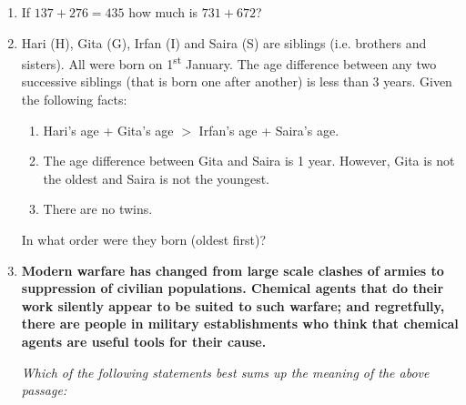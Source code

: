 \documentclass[journal,12pt,onecolumn]{IEEEtran}
\theoremstyle{remark}
\begin{document}
\begin{enumerate}
\begin{enumerate}  \end{enumerate}

\item If $137 + 276 = 435$ how much is $731 + 672$?\hfill{}

\begin{enumerate}  \end{enumerate}

\item Hari (H), Gita (G), Irfan (I) and Saira (S) are siblings (i.e. brothers and sisters). All were born on 1\textsuperscript{st} January. The age difference between any two successive siblings (that is born one after another) is less than 3 years. Given the following facts:

\begin{enumerate}
		\item Hari's age + Gita's age $>$ Irfan's age + Saira's age.
		\item The age difference between Gita and Saira is 1 year. However, Gita is not the oldest and Saira is not the youngest.
		\item There are no twins.
	\end{enumerate}
	In what order were they born (oldest first)?\hfill{}


\begin{enumerate}  \end{enumerate}

\item \textbf{Modern warfare has changed from large scale clashes of armies to suppression of civilian populations. Chemical agents that do their work silently appear to be suited to such warfare; and regretfully, there are people in military establishments who think that chemical agents are useful tools for their cause.}
	\par\noindent \textit{Which of the following statements best sums up the meaning of the above passage:}\hfill{}


\end{enumerate}
\end{document}
